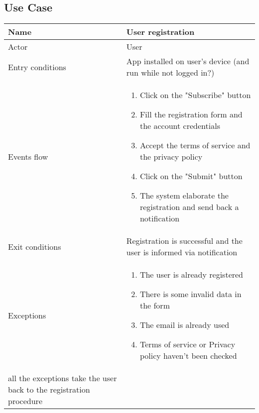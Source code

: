 \subsection{Use Case}
\begin{table}[]
\begin{tabular}{|l|l|}
\hline
Name             & User registration \\ \hline
Actor            & User \\ \hline
Entry conditions & App installed on user's device (and run while not logged in?) \\ \hline
Events flow      & \begin{enumerate}
\item Click on the "Subscribe" button
\item Fill the registration form and the account credentials
\item Accept the terms of service and the privacy policy
\item Click on the "Submit" button
\item The system elaborate the registration and send back a notification
\end{enumerate} 
\\ \hline
Exit conditions  & Registration is successful and the user is informed via notification \\ \hline
Exceptions       & \begin{enumerate}
\item The user is already registered
\item There is some invalid data in the form
\item The email is already used
\item Terms of service or Privacy policy haven't been checked
\end{enumerate}\\ all the exceptions take the user back to the registration procedure \\ \hline
\end{tabular}
\end{table}

